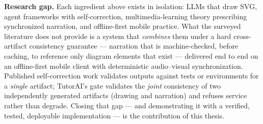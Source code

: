 \textbf{Research gap.} Each ingredient above exists in isolation: LLMs that
draw SVG, agent frameworks with self-correction, multimedia-learning theory
prescribing synchronized narration, and offline-first mobile practice. What
the surveyed literature does not provide is a system that \emph{combines}
them under a hard cross-artifact consistency guarantee --- narration that is
machine-checked, before caching, to reference only diagram elements that
exist --- delivered end to end on an offline-first mobile client with
deterministic audio--visual synchronization. Published self-correction work
validates outputs against tests or environments for a \emph{single} artifact;
TutorAI's gate validates the \emph{joint} consistency of two independently
generated artifacts (drawing and narration) and refuses service rather than
degrade. Closing that gap --- and demonstrating it with a verified, tested,
deployable implementation --- is the contribution of this thesis.
